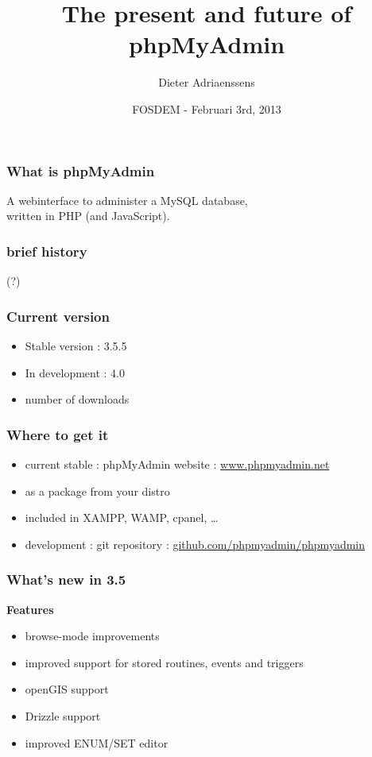 \documentclass[14pt]{beamer}
\title{The present and future of phpMyAdmin}
\author{Dieter Adriaenssens}
\institute{phpMyAdmin}
\date{FOSDEM - Februari 3rd, 2013}
\begin{document}
  \begin{frame}
  \titlepage
  \end{frame}
  \begin{frame}
    \frametitle{What is phpMyAdmin}
      A webinterface to administer a MySQL database,\\
      written in PHP (and JavaScript).
  \end{frame}
  \begin{frame}
    \frametitle{brief history}
    (?)
  \end{frame}
  \begin{frame}
    \frametitle{Current version}
    \begin{itemize}[<+->]
      \item Stable version : 3.5.5
      \item In development : 4.0
      \item number of downloads
    \end{itemize}
  \end{frame}
  \begin{frame}
    \frametitle{Where to get it}
    \begin{itemize}[<+->]
      \item current stable : phpMyAdmin website : \href{http://www.phpmyadmin.net/}{www.phpmyadmin.net}
      \item as a package from your distro
      \item included in XAMPP, WAMP, cpanel, \ldots
      \item development : git repository :  \href{https://github.com/phpmyadmin/phpmyadmin}{github.com/phpmyadmin/phpmyadmin}
    \end{itemize}
  \end{frame}
  \begin{frame}
    \frametitle{What's new in 3.5}
   \textbf{Features}
    \pause
    \begin{itemize}[<+->]
      \item browse-mode improvements
      \item improved support for stored routines, events and triggers
      \item openGIS support
      \item Drizzle support
      \item improved ENUM/SET editor
    \end{itemize}
  \end{frame}
\end{document}
